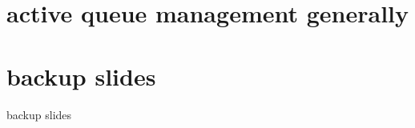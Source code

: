 \section{active queue management generally}




\section{backup slides}
\begin{frame}{backup slides}
\end{frame}


